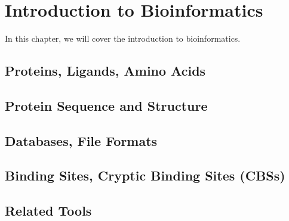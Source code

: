 \chapter{Introduction to Bioinformatics}
\label{chap:intro}

In this chapter, we will cover the introduction to bioinformatics.

\section{Proteins, Ligands, Amino Acids}
\label{sec:proteins}


\section{Protein Sequence and Structure}
\label{sec:prot-seq-str}



\section{Databases, File Formats}
\label{sec:dbs-formats}


\section{Binding Sites, Cryptic Binding Sites (CBSs)}
\label{sec:binding-sites}


\section{Related Tools}
\label{sec:related-tools}

